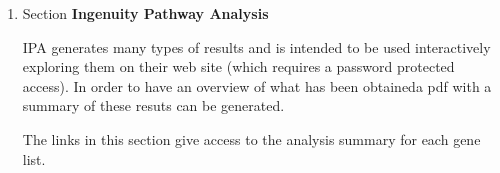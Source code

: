 \documentclass{article}\usepackage[]{graphicx}\usepackage[]{color}
\begin{document}
\begin{enumerate}
\item Section \textbf{Ingenuity Pathway Analysis}

IPA generates many types of results and is intended to be used interactively exploring them on their web site (which requires a password protected access). In order to have an overview of what has been obtaineda pdf with a summary of these resuts can be generated.

The links in this section give access to the analysis summary for each gene list.

\end{enumerate}




\end{document}
